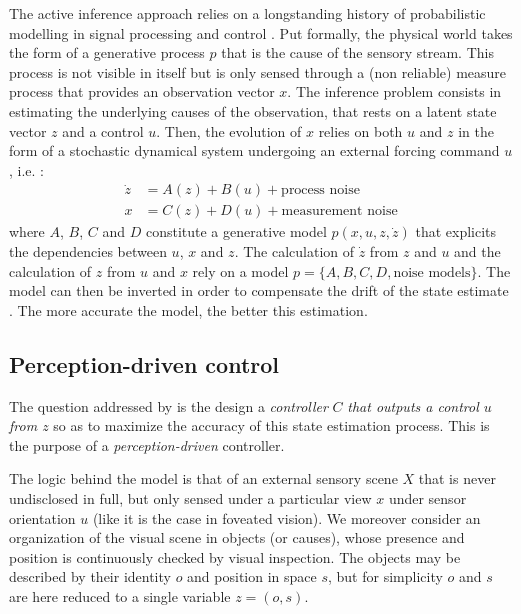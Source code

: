 \documentclass{article} %
\begin{document}
The active inference approach relies on a longstanding history of probabilistic modelling in signal processing and control \cite{Kalman1960,Baum1966,friston1994statistical}.  Put formally, the physical world  takes the form of a generative process $p$ that is the cause of the sensory stream. This process is not visible in itself but is only sensed through a (non reliable) measure process that provides an observation vector $x$. The inference problem consists in estimating the underlying causes of the observation, that rests on a latent state vector $z$ and a control $u$.  Then, the evolution of $x$ relies on both $u$ and $z$ in the form of a stochastic dynamical system undergoing an external forcing command $u$, i.e. :
\begin{align}
\dot{z} &= A(z) + B(u) + \text{process noise}\label{eq:kalman-process}\\
x &= C(z) + D(u) + \text{measurement noise} \label{eq:kalman-measure}
\end{align}  
where $A$, $B$, $C$ and $D$ constitute a generative model $p(x,u,z,\dot{z})$ that explicits the dependencies between $u$, $x$ and $z$. %
The calculation of $\dot{z}$ from $z$ and $u$ and the calculation of $z$ from $u$ and $x$ rely on a model $p = \{A,B,C,D,\text{noise models}\}$. The model can then be inverted in order to compensate the drift of the state estimate \cite{Kalman1960,Baum1966}. The more accurate the model, the better this estimation. 

\subsection{Perception-driven control}
The question addressed by \cite{friston2012perceptions} is the design a \emph{controller} $C$ \emph{that outputs a control $u$ from $z$} so as to maximize the accuracy of this state estimation process. This is the purpose of a \emph{perception-driven} controller.

The logic behind the model is that of an external sensory scene $X$ that is never undisclosed in full, but only sensed under a particular view $x$ under sensor orientation $u$ (like it is the case in foveated vision). 
We moreover consider an organization of the visual scene in objects (or causes), whose presence and position is continuously checked by visual inspection. The objects may be described by their identity $o$ and position in space $s$, but for simplicity $o$ and $s$ are here reduced to a single variable $z = (o, s)$. 
\end{document}
